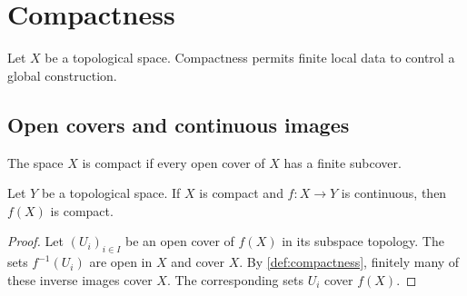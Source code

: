 \chapter{Compactness}
\label{chap:compactness}
Let $X$ be a topological space. Compactness permits finite local data to control a global construction.

\section{Open covers and continuous images}

\begin{definition}
\label{def:compactness}
The space $X$ is compact if every open cover of $X$ has a finite subcover.
\end{definition}
\begin{lemma}
\label{lem:compact-image}
Let $Y$ be a topological space. If $X$ is compact and $f\colon X\to Y$ is continuous, then $f(X)$ is compact.
\end{lemma}
\begin{proof}
Let $(U_i)_{i\in I}$ be an open cover of $f(X)$ in its subspace topology. The sets $f^{-1}(U_i)$ are open in $X$ and cover $X$. By \cref{def:compactness}, finitely many of these inverse images cover $X$. The corresponding sets $U_i$ cover $f(X)$.
\end{proof}
